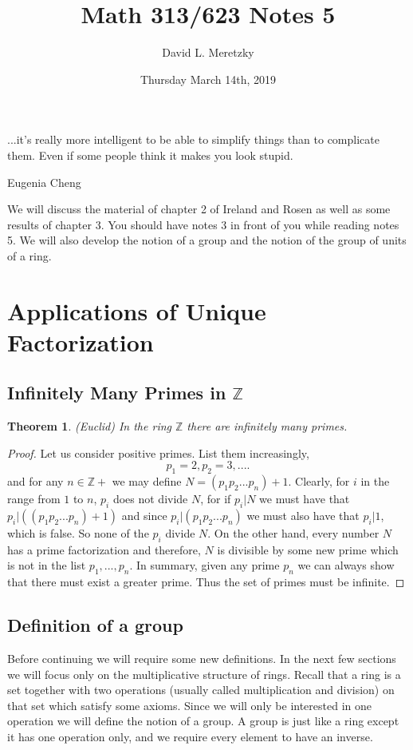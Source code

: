 \documentclass{article}
\title{ \vspace{-10ex} %
Math 313/623 Notes 5
}
\author{David L. Meretzky
}
\date{%
Thursday March 14th, 2019
}
\theoremstyle{problemstyle}
\newtheorem{theorem}{Theorem}
\begin{document}
\maketitle

\epigraph{...it's really more intelligent to be able to simplify things than to complicate them. Even if some people think it makes you look stupid.}{Eugenia Cheng}

We will discuss the material of chapter 2 of Ireland and Rosen as well as some results of chapter 3. You should have notes 3 in front of you while reading notes 5. We will also develop the notion of a group and the notion of the group of units of a ring. 

\section*{Applications of Unique Factorization}

\subsection*{Infinitely Many Primes in $\mathbb{Z}$}

\begin{theorem}(Euclid)
In the ring $\mathbb{Z}$ there are infinitely many primes. 
\end{theorem}
\begin{proof}
Let us consider positive primes. List them increasingly, $$p_1 = 2, p_2 = 3,....$$ and for any $n \in \mathbb{Z}+$ we may define $N = (p_1p_2...p_n)+1$. Clearly, for $i$ in the range from $1$ to $n$, $p_i$ does not divide $N$, for if $p_i|N$ we must have that $p_i|((p_1p_2...p_n)+1)$ and since $p_i|(p_1p_2...p_n)$ we must also have that $p_i|1$, which is false. So none of the $p_i$ divide $N$. On the other hand, every number $N$ has a prime factorization and therefore, $N$ is divisible by some new prime which is not in the list $p_1,...,p_n$. In summary, given any prime $p_n$ we can always show that there must exist a greater prime. Thus the set of primes must be infinite. 
\end{proof}

\subsection*{Definition of a group}

Before continuing we will require some new definitions. In the next few sections we will focus only on the multiplicative structure of rings. Recall that a ring is a set together with two operations (usually called multiplication and division) on that set which satisfy some axioms. Since we will only be interested in one operation we will define the notion of a group. A group is just like a ring except it has one operation only, and we require every element to have an inverse. 
\end{document}
